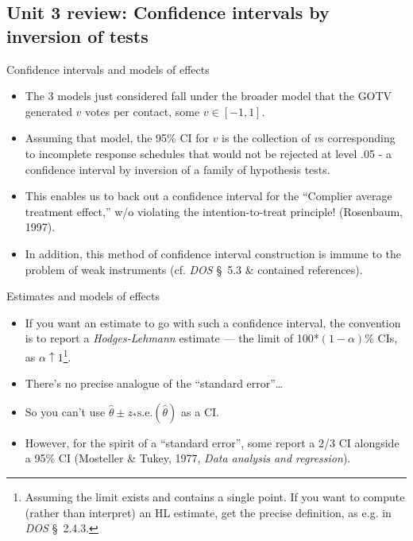 \subsection[U3 review]{Unit 3 review: Confidence intervals by inversion of tests}
\begin{frame}{Confidence intervals and models of effects}

  \begin{itemize}[<+->]
  \item The 3 models just considered fall under the broader model that the GOTV
generated $v$ votes per contact, some $v \in [-1, 1]$.
\item Assuming that model, the 95\% CI for $v$ is the collection of $v$s corresponding to incomplete response schedules that would not be rejected at level .05 - a confidence interval by inversion of a family of hypothesis tests.
\item This enables us to back out a confidence interval for the
  ``Complier average treatment effect,'' w/o violating the
  intention-to-treat principle! (Rosenbaum, 1997).
\item In addition, this method of confidence interval construction is
  immune to the problem of weak instruments (cf. \textit{DOS} \S~5.3 \&
  contained references).
  \end{itemize}


\end{frame}

\begin{frame}{Estimates and models of effects}
  
  \begin{itemize}
\item If you want an estimate to go with such a confidence interval,
  the convention is to report a \textit{Hodges-Lehmann} estimate ---
  the limit of 100*$(1-\alpha)$\% CIs, as $\alpha \uparrow
  1$\footnote{Assuming the limit exists and contains a single
    point. If you want to compute (rather than interpret) an HL
    estimate, get the precise definition, as e.g. in \textit{DOS} \S~2.4.3. }. 
\item There's no precise analogue of the ``standard error''\ldots
\item So you can't use $\hat{\theta} \pm z_{*}\mathrm{s.e.}(\hat
  \theta)$ as a CI. 
\item However, for the spirit of a ``standard error'', some report a 2/3 CI alongside a 95\% CI  (Mosteller \& Tukey, 1977, \textit{Data analysis and regression}).
  \end{itemize}
\end{frame}
